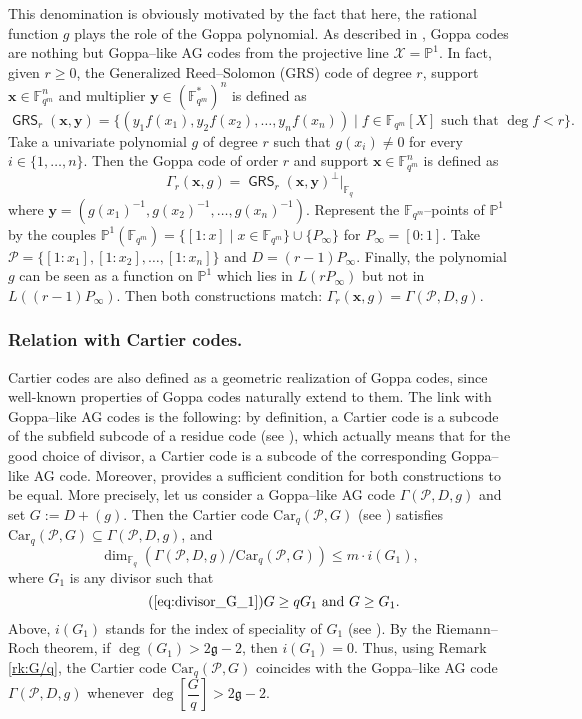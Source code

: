 \documentclass[a4paper]{amsart}
\theoremstyle{definition}
\theoremstyle{remark}
\newcommand{\calP}{\mathcal{P}}
\newcommand{\calX}{\mathcal{X}}
\newcommand{\fqm}{\mathbb{F}_{q^m}}
\newcommand{\fq}{\mathbb{F}_{q}}
\newcommand{\PP}{\mathbb{P}}
\newcommand{\GRS}{\operatorname{\mathsf{GRS}}}
\begin{document}
This denomination is obviously motivated by the fact that here, the rational function $g$ plays the role of the Goppa polynomial. As described in \cite[Example~9.1.8]{Sti09}, Goppa codes are nothing but Goppa--like AG codes from the projective line $\calX=\PP^1$. In fact, given $r \geq 0$, the Generalized Reed--Solomon (GRS) code of degree $r$, support $\mathbf{x} \in \fqm^n$ and multiplier $\mathbf{y} \in (\fqm^*)^n$ is defined as
\[\GRS_r(\mathbf{x},\mathbf{y})=\{(y_1f(x_1),y_2f(x_2),\dots,y_nf(x_n)) \mid f \in \fqm[X] \text{ such that } \deg f < r \}.\]
Take a univariate polynomial $g$ of degree $r$ such that $g(x_i) \neq 0$ for every  $i \in \{1,\dots,n\}$. Then the Goppa code of order $r$ and support $\mathbf{x} \in \fqm^n$ is defined as
\[\Gamma_r(\mathbf{x},g)= \GRS_r(\mathbf{x},\mathbf{y})^\perp|_{\fq}\]
where $\mathbf{y}=(g(x_1)^{-1},g(x_2)^{-1},\dots,g(x_n)^{-1})$.
Represent the $\fqm$--points of $\PP^1$ by the couples $\PP^1(\fqm)=\{[1:x] \mid x \in \fqm\} \cup \{P_\infty\}$ for $P_\infty=[0:1]$. Take $\calP=\{[1:x_1],[1:x_2],\dots,[1:x_n]\}$ and $D=(r-1)P_\infty$. Finally, the polynomial $g$ can be seen as a function on $\PP^1$ which lies in $L(rP_\infty)$ but not in $L((r-1)P_\infty)$. Then both constructions match: $\Gamma_r(\mathbf{x},g)=\Gamma(\calP,D,g)$.

\subsubsection{Relation with Cartier codes.} Cartier codes \cite{Cou14} are also defined as a geometric realization of Goppa codes, since well-known properties of Goppa codes naturally extend to them.
The link with Goppa--like AG codes is the following: by definition, a Cartier code is a subcode of the subfield subcode of a residue code (see \cite[Proposition 4.3]{Cou14}), which actually means that for the good choice of divisor, a Cartier code is a subcode of the corresponding Goppa--like AG code. Moreover, \cite[Theorem 5.1]{Cou14} provides a sufficient condition for both constructions to be equal. More precisely, let us consider a Goppa--like AG code $\Gamma(\calP,D,g)$  and set $G := D+(g)$. Then the Cartier code $\mathrm{Car}_q(\calP,G)$ (see \cite[Definition 4.2]{Cou14}) satisfies $\mathrm{Car}_q(\calP,G) \subseteq \Gamma(\calP,D,g)$, and 
$$ \dim_{\fq} \left( \Gamma(\calP,D,g)/ \mathrm{Car}_q(\calP,G)\right) \leq m \cdot i(G_1),$$
where $G_1$ is any divisor such that 
\begin{equation} \tag{\ref{eq:divisor_G_1}}
G \geq qG_1 \ \mathrm{and} \ G \geq G_1.
\end{equation}
 Above, $i(G_1)$ stands for the index of speciality of $G_1$ (see \cite[Definition~1.6.10]{Sti09}). By the Riemann--Roch theorem, if $\deg(G_1) > 2\mathfrak{g}-2$, then $i(G_1) =0.$ 
Thus, using Remark \ref{rk:G/q}, the Cartier code $\mathrm{Car}_q(\calP,G)$ coincides with the Goppa--like AG code $\Gamma(\calP,D,g)$ whenever $\deg\left[\dfrac{G}{q} \right] > 2\mathfrak{g}-2$. 
\end{document}
